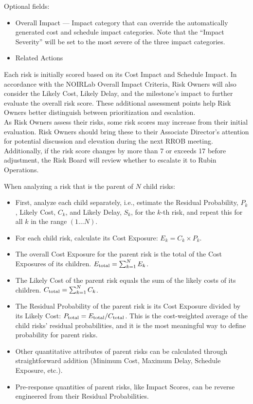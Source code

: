Optional fields:
\begin{itemize}
	\item Overall Impact --- Impact category that can override the automatically generated cost and schedule impact categories. Note that the ``Impact Severity'' will be set to the most severe of the three impact categories.
	\item Related Actions
\end{itemize}

Each risk is initially scored based on its Cost Impact and Schedule Impact. In accordance with the NOIRLab Overall Impact Criteria, Risk Owners will also consider the Likely Cost, Likely Delay, and the milestone's impact to further evaluate the overall risk score. These additional assessment points help Risk Owners better distinguish between prioritization and escalation.
\\
As Risk Owners assess their risks, some risk scores may increase from their initial evaluation. Risk Owners should bring these to their Associate Director's attention for potential discussion and elevation during the next RROB meeting. Additionally, if the risk score changes by more than 7 or exceeds 17 before adjustment, the Risk Board will review whether to escalate it to Rubin Operations.


When analyzing a risk that is the parent of $N$ child risks:

\begin{itemize}
	\item First, analyze each child separately, i.e., estimate the Residual Probability, $P_k$, Likely Cost, $C_k$, and Likely Delay, $S_k$, for the $k$-th risk, and repeat this for all $k$ in the range $(1 \ldots N)$.
	\item For each child risk, calculate its Cost Exposure: $E_k = C_k \times P_k$.
	\item The overall Cost Exposure for the parent risk is the total of the Cost Exposures of its children. $E_{\rm total} = \sum_{k=1}^N E_k$.
	\item The Likely Cost of the parent risk equals the sum of the likely costs of its children. $C_{\rm total} = \sum_{k=1}^N C_k$.
	\item The Residual Probability of the parent risk is its Cost Exposure divided by its Likely Cost: $P_{\rm total} = E_{\rm total} / C_{\rm total}$.
	This is the cost-weighted average of the child risks' residual probabilities, and it is the most meaningful way to define probability for parent risks.
	\item Other quantitative attributes of parent risks can be calculated through straightforward addition (Minimum Cost, Maximum Delay, Schedule Exposure, etc.).
	\item Pre-response quantities of parent risks, like Impact Scores, can be reverse engineered from their Residual Probabilities.
\end{itemize}


